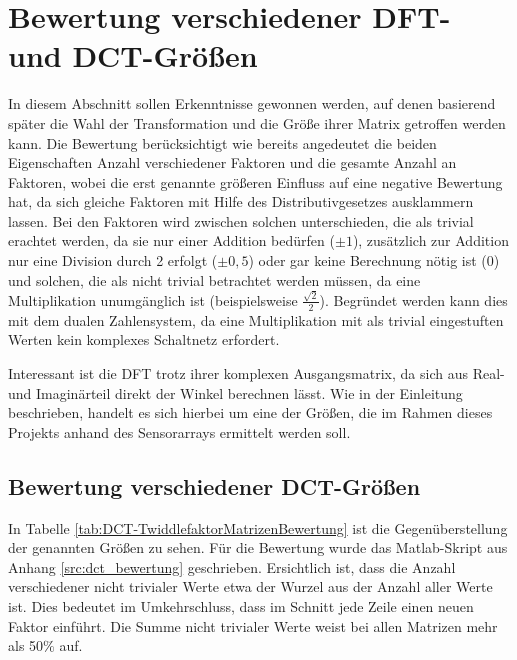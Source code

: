 \section{Bewertung verschiedener DFT- und DCT-Größen}\label{sec:BewertungVerschiedenerGroessen}
In diesem Abschnitt sollen Erkenntnisse gewonnen werden, auf denen basierend später die Wahl der Transformation und die Größe ihrer Matrix getroffen werden kann.
Die Bewertung berücksichtigt wie bereits angedeutet die beiden Eigenschaften Anzahl verschiedener Faktoren und die gesamte Anzahl an Faktoren, wobei die erst genannte 
größeren Einfluss auf eine negative Bewertung hat, da sich gleiche Faktoren mit Hilfe des Distributivgesetzes ausklammern lassen.
Bei den Faktoren wird zwischen solchen unterschieden, die als trivial erachtet werden, da sie nur einer Addition bedürfen ($\pm1$), zusätzlich
zur Addition nur eine Division durch 2 erfolgt ($\pm0,5$) oder gar keine Berechnung nötig ist ($0$) und solchen, die als nicht trivial betrachtet werden müssen, da eine Multiplikation
unumgänglich ist (beispielsweise $\tfrac{\sqrt{2}}{2}$). Begründet werden kann dies mit dem dualen Zahlensystem, da eine Multiplikation mit als trivial eingestuften Werten kein
komplexes Schaltnetz erfordert.

Interessant ist die DFT trotz ihrer komplexen Ausgangsmatrix, da sich aus Real- und Imaginärteil direkt der Winkel berechnen lässt.
Wie in der Einleitung beschrieben, handelt es sich hierbei um eine der Größen, die im Rahmen dieses Projekts anhand des Sensorarrays ermittelt werden soll.



\subsection{Bewertung verschiedener DCT-Größen}
In Tabelle \ref{tab:DCT-TwiddlefaktorMatrizenBewertung} ist die Gegenüberstellung der genannten Größen zu sehen. Für die Bewertung wurde das 
Matlab-Skript aus Anhang \ref{src:dct_bewertung} geschrieben.
Ersichtlich ist, dass die Anzahl verschiedener nicht trivialer Werte etwa der Wurzel aus der Anzahl aller Werte ist.
Dies bedeutet im Umkehrschluss, dass im Schnitt jede Zeile einen neuen Faktor einführt. Die Summe nicht trivialer Werte weist bei allen Matrizen
mehr als 50$\%$ auf. 

